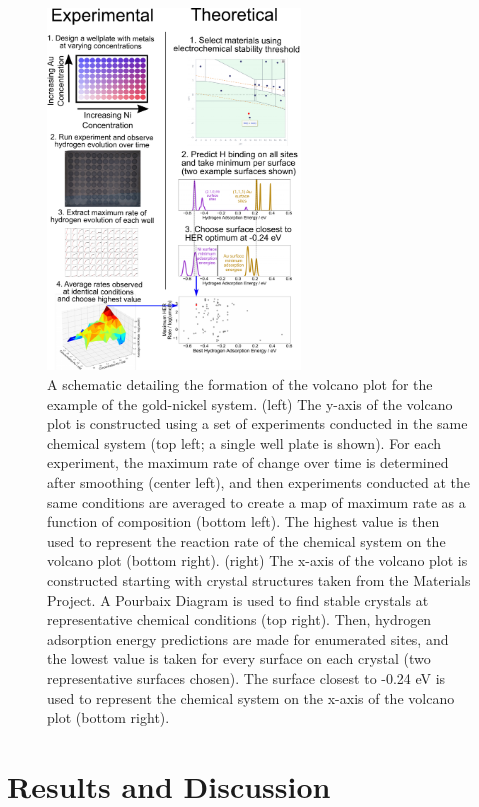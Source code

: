 \documentclass[preprint,12pt]{elsarticle}
\begin{document}
\begin{figure}[h!]
\centering
    \includegraphics[width=0.6\textwidth]{figures/fig_3.pdf}
\caption{A schematic detailing the formation of the volcano plot for the example of the gold-nickel system. (left) The y-axis of the volcano plot is constructed using a set of experiments conducted in the same chemical system (top left; a single well plate is shown). For each experiment, the maximum rate of change over time is determined after smoothing (center left), and then experiments conducted at the same conditions are averaged to create a map of maximum rate as a function of composition (bottom left). The highest value is then used to represent the reaction rate of the chemical system on the volcano plot (bottom right). (right) The x-axis of the volcano plot is constructed starting with crystal structures taken from the Materials Project. A Pourbaix Diagram is used to find stable crystals at representative chemical conditions (top right). Then, hydrogen adsorption energy predictions are made for enumerated sites, and the lowest value is taken for every surface on each crystal (two representative surfaces chosen). The surface closest to -0.24 eV is used to represent the chemical system on the x-axis of the volcano plot (bottom right).
}
\label{figure_3}
\end{figure}

\section{Results and Discussion}\label{Section:Results}
\end{document}
